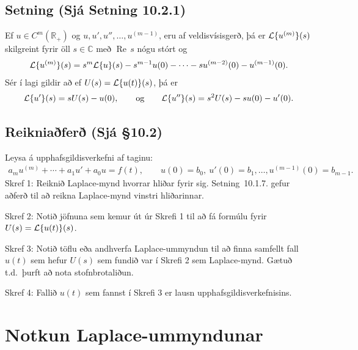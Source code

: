 \documentclass[a4paper,10pt,icelandic]{sphinxmanual}
\begin{document}
\subsection{Setning (Sjá Setning 10.2.1)}
\label{\detokenize{Kafli10:setning-sja-setning-10-2-1}}
Ef \(u\in C^ m(\mathbb{R}_+)\) og \(u, u', u'', \dots, u^{(m-1)}\), eru af veldisvísisgerð, þá er \({\cal L}\{u^{(m)}\}(s)\) skilgreint fyrir öll \(s\in {\mathbb{C}}\) með \(\operatorname{Re\, } s\) nógu stórt og
\begin{equation*}
\begin{split}{\cal L}\{u^{(m)}\}(s)=s^
m{\cal L}\{u\}(s)-s^{m-1}u(0)-\cdots
-su^{(m-2)}(0)-u^{(m-1)}(0).\end{split}
\end{equation*}
Sér í lagi gildir að ef \(U(s)={\cal L}\{u(t)\}(s)\), þá er
\begin{equation*}
\begin{split}{\cal L}\{u'\}(s)  = sU(s)-u(0),\qquad\mbox{og}\qquad
{\cal L}\{u''\}(s) =s^2U(s)-su(0)-u'(0).\end{split}
\end{equation*}

\subsection{Reikniaðferð (Sjá \S{}10.2)}
\label{\detokenize{Kafli10:reikniafer-sja-10-2}}
Leysa á upphafsgildisverkefni af taginu:
\begin{equation*}
\begin{split}a_mu^{(m)}+\cdots +a_1u'+a_0u=f(t), \qquad u(0)=b_0,\ u'(0)=b_1,\ldots,u^{(m-1)}(0)=b_{m-1}.\end{split}
\end{equation*}
Skref 1: Reiknið Laplace-mynd hvorrar hliðar fyrir sig. Setning 10.1.7. gefur aðferð til að reikna Laplace-mynd vinstri hliðarinnar.

Skref 2: Notið jöfnuna sem kemur út úr Skrefi 1 til að fá formúlu fyrir \(U(s)={\cal L}\{u(t)\}(s)\).

Skref 3: Notið töflu eða andhverfa Laplace-ummyndun til að finna samfellt fall \(u(t)\) sem hefur \(U(s)\) sem fundið var í Skrefi 2 sem Laplace-mynd. Gætuð t.d. þurft að nota stofnbrotaliðun.

Skref 4: Fallið \(u(t)\) sem fannst í Skrefi 3 er lausn upphafsgildisverkefnisins.


\section{Notkun Laplace-ummyndunar}
\label{\detokenize{Kafli10:notkun-laplace-ummyndunar}}
\end{document}
